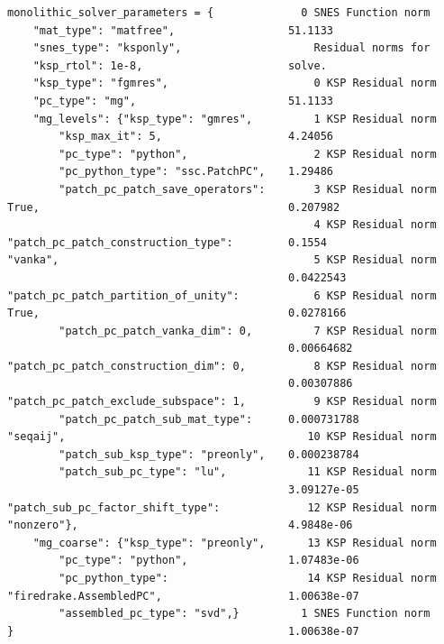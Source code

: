 \documentclass[presentation,aspectratio=43]{beamer}
\begin{document}
\begin{frame}[fragile]
\begin{onlyenv}
\begin{onlyenv}
\begin{columns}
\begin{column}{0.6\textwidth}
\begin{verbatim}
monolithic_solver_parameters = {
    "mat_type": "matfree",
    "snes_type": "ksponly",
    "ksp_rtol": 1e-8,
    "ksp_type": "fgmres",
    "pc_type": "mg",
    "mg_levels": {"ksp_type": "gmres",
        "ksp_max_it": 5,
        "pc_type": "python",
        "pc_python_type": "ssc.PatchPC",
        "patch_pc_patch_save_operators": True,
        "patch_pc_patch_construction_type": "vanka",
        "patch_pc_patch_partition_of_unity": True,
        "patch_pc_patch_vanka_dim": 0,
        "patch_pc_patch_construction_dim": 0,
        "patch_pc_patch_exclude_subspace": 1,
        "patch_pc_patch_sub_mat_type": "seqaij",
        "patch_sub_ksp_type": "preonly",
        "patch_sub_pc_type": "lu",
        "patch_sub_pc_factor_shift_type": "nonzero"},
    "mg_coarse": {"ksp_type": "preonly",
        "pc_type": "python",
        "pc_python_type": "firedrake.AssembledPC",
        "assembled_pc_type": "svd",}
}
\end{verbatim}
      \end{column}
      \hspace{-1em}
      \begin{column}{0.4\textwidth}
\begin{verbatim}
  0 SNES Function norm 51.1133
    Residual norms for  solve.
    0 KSP Residual norm 51.1133
    1 KSP Residual norm 4.24056
    2 KSP Residual norm 1.29486
    3 KSP Residual norm 0.207982
    4 KSP Residual norm 0.1554
    5 KSP Residual norm 0.0422543
    6 KSP Residual norm 0.0278166
    7 KSP Residual norm 0.00664682
    8 KSP Residual norm 0.00307886
    9 KSP Residual norm 0.000731788
   10 KSP Residual norm 0.000238784
   11 KSP Residual norm 3.09127e-05
   12 KSP Residual norm 4.9848e-06
   13 KSP Residual norm 1.07483e-06
   14 KSP Residual norm 1.00638e-07
  1 SNES Function norm 1.00638e-07
\end{verbatim}
      \end{column}
    \end{columns}
    \end{onlyenv}
  \end{onlyenv}
\end{frame}
\end{document}
